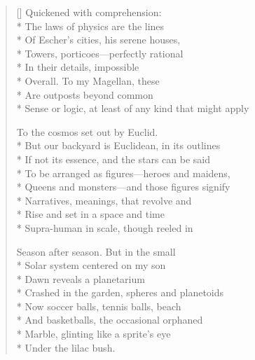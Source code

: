 \begin{verse}[\versewidth]
Quickened with comprehension:\\*
The laws of physics are the lines\\*
Of Escher's cities, his serene houses,\\*
Towers, porticoes---perfectly rational\\*
In their details, impossible\\*
Overall. To my Magellan, these\\*
Are outposts beyond common\\*
Sense or logic, at least of any kind that might apply

To the cosmos set out by Euclid.\\*
But our backyard is Euclidean, in its outlines\\*
If not its essence, and the stars can be said\\*
To be arranged as figures---heroes and maidens,\\*
Queens and monsters---and those figures signify\\*
Narratives, meanings, that revolve and\\*
Rise and set in a space and time\\*
Supra-human in scale, though reeled in

Season after season.  But in the small\\*
Solar system centered on my son\\*
Dawn reveals a planetarium\\*
Crashed in the garden, spheres and planetoids\\*
Now soccer balls, tennis balls, beach\\*
And basketballs, the occasional orphaned \\*
Marble, glinting like a sprite's eye\\*
Under the lilac bush.
\end{verse}
